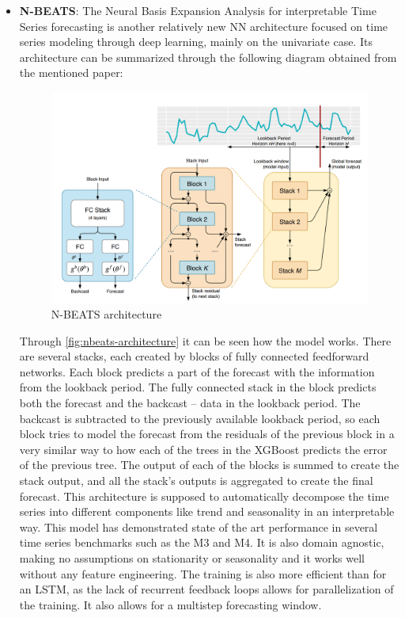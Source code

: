 \begin{itemize}
    \item \textbf{N-BEATS}: The Neural Basis Expansion Analysis for interpretable Time Series forecasting is another relatively new NN architecture focused on time series modeling through deep learning, mainly on the univariate case. Its architecture can be summarized through the following diagram obtained from the mentioned paper:
    \begin{figure}[ht]
        \centering
        \captionsetup{justification=centering}
        \includegraphics[width=\linewidth]{assets/nbeats-architecture.png}
        \caption{N-BEATS architecture}
        \label{fig:nbeats-architecture}
    \end{figure}
    Through \autoref{fig:nbeats-architecture} it can be seen how the model works. There are several stacks, each created by blocks of fully connected feedforward networks. Each block predicts a part of the forecast with the information from the lookback period. The fully connected stack in the block predicts both the forecast and the backcast -- data in the lookback period. The backcast is subtracted to the previously available lookback period, so each block tries to model the forecast from the residuals of the previous block in a very similar way to how each of the trees in the XGBoost predicts the error of the previous tree. The output of each of the blocks is summed to create the stack output, and all the stack's outputs is aggregated to create the final forecast. This architecture is supposed to automatically decompose the time series into different components like trend and seasonality in an interpretable way. This model has demonstrated state of the art performance in several time series benchmarks such as the M3 and M4. It is also domain agnostic, making no assumptions on stationarity or seasonality and it works well without any feature engineering. The training is also more efficient than for an LSTM, as the lack of recurrent feedback loops allows for parallelization of the training. It also allows for a multistep forecasting window. 
    

\end{itemize}
